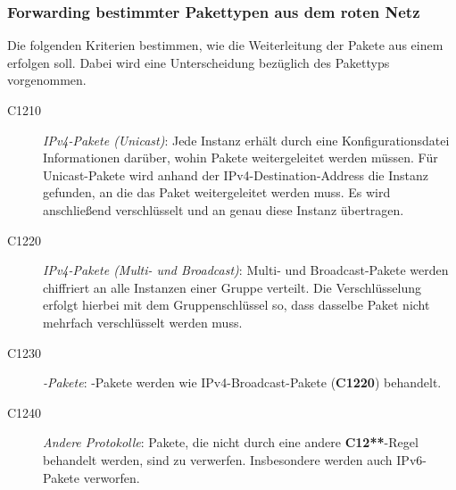 \subsubsection{Forwarding bestimmter Pakettypen aus dem roten Netz}
Die folgenden Kriterien bestimmen, wie die Weiterleitung der Pakete aus einem  erfolgen soll. 
Dabei wird eine Unterscheidung bezüglich des Pakettyps vorgenommen.
	\begin{description}
	   \item[C1210] \textit{IPv4-Pakete (Unicast)}: Jede Instanz erhält durch eine Konfigurationsdatei Informationen darüber, wohin Pakete weitergeleitet werden müssen.
	   Für Unicast-Pakete wird anhand der IPv4-Destination-Address die Instanz gefunden, an die das Paket weitergeleitet werden muss. 
	   Es wird anschließend verschlüsselt und an genau diese Instanz übertragen.
	  
	   \item[C1220] \textit{IPv4-Pakete (Multi- und Broadcast)}: Multi- und Broadcast-Pakete werden chiffriert an alle Instanzen einer Gruppe verteilt. 
	   Die Verschlüsselung erfolgt hierbei mit dem Gruppenschlüssel so, dass dasselbe Paket nicht mehrfach verschlüsselt werden muss.
	  
	   \item[C1230] \textit{-Pakete}: -Pakete werden wie IPv4-Broadcast-Pakete (\textbf{C1220}) behandelt. 
	  
	   \item[C1240] \textit{Andere Protokolle}: Pakete, die nicht durch eine andere \textbf{C12**}-Regel behandelt werden, sind zu verwerfen. Insbesondere werden auch IPv6-Pakete verworfen.
	\end{description}


